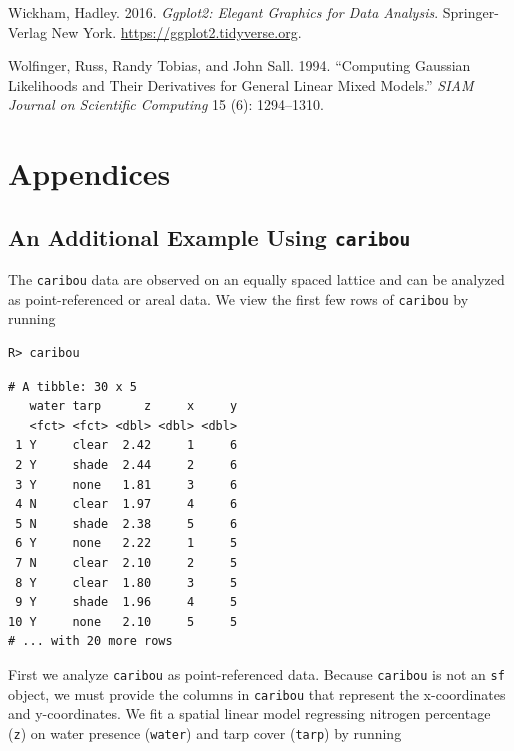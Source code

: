 \documentclass{article}
\begin{document}
\leavevmode\hypertarget{ref-wickham2016ggplot2}{}%
Wickham, Hadley. 2016. \emph{Ggplot2: Elegant Graphics for Data
Analysis}. Springer-Verlag New York.
\url{https://ggplot2.tidyverse.org}.

\leavevmode\hypertarget{ref-wolfinger1994computing}{}%
Wolfinger, Russ, Randy Tobias, and John Sall. 1994. ``Computing Gaussian
Likelihoods and Their Derivatives for General Linear Mixed Models.''
\emph{SIAM Journal on Scientific Computing} 15 (6): 1294--1310.

\newpage

\hypertarget{appendices}{%
\section*{Appendices}\label{appendices}}

\renewcommand{\thesubsection}{\Alph{subsection}}

\hypertarget{app:caribou}{%
\subsection{\texorpdfstring{An Additional Example Using
\texttt{caribou}}{An Additional Example Using caribou}}\label{app:caribou}}

The \texttt{caribou} data are observed on an equally spaced lattice and
can be analyzed as point-referenced or areal data. We view the first few
rows of \texttt{caribou} by running

\begin{verbatim}
R> caribou
\end{verbatim}

\begin{verbatim}
# A tibble: 30 x 5
   water tarp      z     x     y
   <fct> <fct> <dbl> <dbl> <dbl>
 1 Y     clear  2.42     1     6
 2 Y     shade  2.44     2     6
 3 Y     none   1.81     3     6
 4 N     clear  1.97     4     6
 5 N     shade  2.38     5     6
 6 Y     none   2.22     1     5
 7 N     clear  2.10     2     5
 8 Y     clear  1.80     3     5
 9 Y     shade  1.96     4     5
10 Y     none   2.10     5     5
# ... with 20 more rows
\end{verbatim}

First we analyze \texttt{caribou} as point-referenced data. Because
\texttt{caribou} is not an \texttt{sf} object, we must provide the
columns in \texttt{caribou} that represent the x-coordinates and
y-coordinates. We fit a spatial linear model regressing nitrogen
percentage (\texttt{z}) on water presence (\texttt{water}) and tarp
cover (\texttt{tarp}) by running
\end{document}

